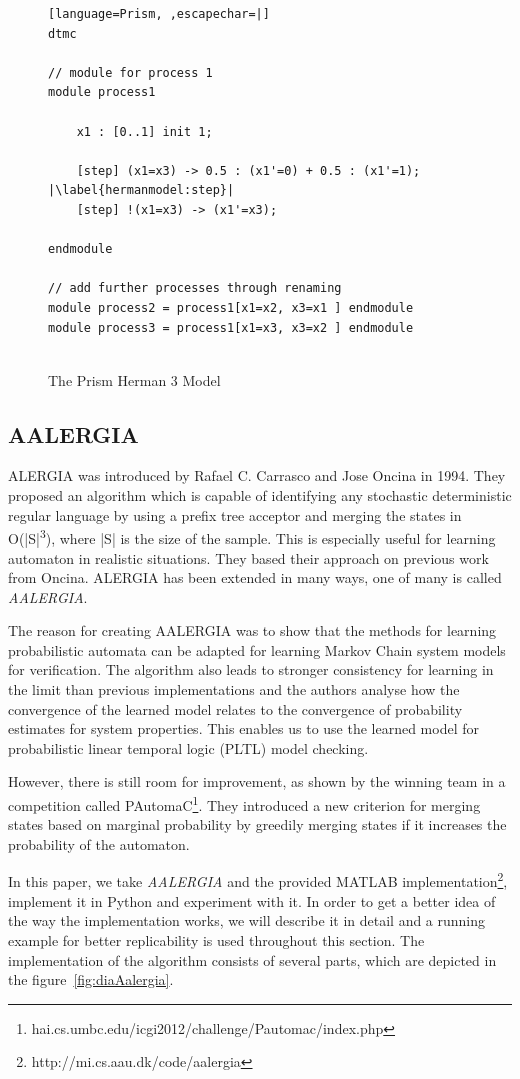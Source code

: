 \documentclass[
a4paper,
12pt
]{scrartcl}
\begin{document}
\begin{figure}[ht!]
\begin{lstlisting}[language=Prism, ,escapechar=|]
dtmc

// module for process 1
module process1

	x1 : [0..1] init 1;
	
	[step] (x1=x3) -> 0.5 : (x1'=0) + 0.5 : (x1'=1); |\label{hermanmodel:step}|
	[step] !(x1=x3) -> (x1'=x3);
	
endmodule

// add further processes through renaming
module process2 = process1[x1=x2, x3=x1 ] endmodule
module process3 = process1[x1=x3, x3=x2 ] endmodule


\end{lstlisting}
\caption{The Prism Herman 3 Model}
\label{fig:hermanmodel}
\end{figure}

\subsection{AALERGIA}
ALERGIA\cite{Carrasco.1994} was introduced by Rafael C. Carrasco and Jose Oncina in 1994. They proposed an algorithm which is capable of identifying any stochastic deterministic regular language by using a prefix tree acceptor and merging the states in O(|S|\textsuperscript{3}), where |S| is the size of the sample. This is especially useful for learning automaton in realistic situations. They based their approach on previous work from Oncina\cite{Oncina92}. ALERGIA has been extended in many ways, one of many is called \emph{AALERGIA}\cite{Mao.}.
\par The reason for creating AALERGIA was to show that the methods for learning probabilistic automata can be adapted for learning Markov Chain system models for verification. The algorithm also leads to stronger consistency for learning in the limit than previous implementations and the authors analyse how the convergence of the learned model relates to the convergence of probability estimates for system properties. This enables us to use the learned model for probabilistic linear temporal logic (PLTL) model checking.
\par However, there is still room for improvement, as shown by the winning team\cite{Shibata_the11th} in a competition called PAutomaC\footnote{hai.cs.umbc.edu/icgi2012/challenge/Pautomac/index.php}. They introduced a new criterion for merging states based on marginal probability by greedily merging states if it increases the probability of the automaton.
\par In this paper, we take \emph{AALERGIA} and the provided MATLAB implementation\footnote{http://mi.cs.aau.dk/code/aalergia}, implement it in Python and experiment with it. In order to get a better idea of the way the implementation works, we will describe it in detail and a running example for better replicability is used throughout this section. The implementation of the algorithm consists of several parts, which are depicted in the figure~\ref{fig:diaAalergia}.
\end{document}
